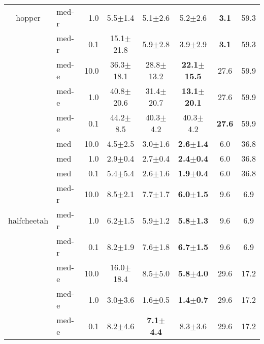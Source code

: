 \begin{table}[!t]
\begin{adjustbox}{center}
{\begin{tabular}{c|l|r|c|c|c|c|c}
         hopper & med-r & 1.0 & 5.5$\pm$1.4 & 5.1$\pm$2.6 & 5.2$\pm$2.6 & \textbf{3.1} & 59.3\\
         & med-r & 0.1 & 15.1$\pm$21.8 & 5.9$\pm$2.8 & 3.9$\pm$2.9 & \textbf{3.1} & 59.3 \\
         & med-e & 10.0 & 36.3$\pm$18.1 & 28.8$\pm$13.2 & \textbf{22.1$\pm$15.5} & 27.6 & 59.9 \\
         & med-e & 1.0 & 40.8$\pm$20.6 & 31.4$\pm$20.7 & \textbf{13.1$\pm$20.1} & 27.6 & 59.9 \\
         & med-e & 0.1 & 44.2$\pm$8.5\phantom{0} & 40.3$\pm$4.2\phantom{0} & 40.3$\pm$4.2\phantom{0} & \textbf{27.6} & 59.9 \\
    \midrule
         & med & 10.0 & 4.5$\pm$2.5 & 3.0$\pm$1.6 & \textbf{2.6$\pm$1.4} & 6.0 & 36.8 \\
         & med & 1.0 & 2.9$\pm$0.4 & 2.7$\pm$0.4 & \textbf{2.4$\pm$0.4} & 6.0 & 36.8 \\
         & med & 0.1 & 5.4$\pm$5.4 & 2.6$\pm$1.6 & \textbf{1.9$\pm$0.4} & 6.0 & 36.8 \\
         & med-r & 10.0 & 8.5$\pm$2.1 & 7.7$\pm$1.7 & \textbf{6.0$\pm$1.5} & 9.6 & 6.9 \\
         halfcheetah & med-r & 1.0 & 6.2$\pm$1.5 & 5.9$\pm$1.2 & \textbf{5.8$\pm$1.3} & 9.6 & 6.9 \\
         & med-r & 0.1 & 8.2$\pm$1.9 & 7.6$\pm$1.8 & \textbf{6.7$\pm$1.5} & 9.6 & 6.9 \\
         & med-e & 10.0 & 16.0$\pm$18.4 & 8.5$\pm$5.0 & \textbf{5.8$\pm$4.0} & 29.6 & 17.2 \\
         & med-e & 1.0 & 3.0$\pm$3.6 & 1.6$\pm$0.5 & \textbf{1.4$\pm$0.7} & 29.6 & 17.2 \\
         & med-e & 0.1 & 8.2$\pm$4.6 & \textbf{7.1$\pm$4.4} & 8.3$\pm$3.6 & 29.6 & 17.2 \\

    \bottomrule
\end{tabular}}
\end{adjustbox}
\end{table}

